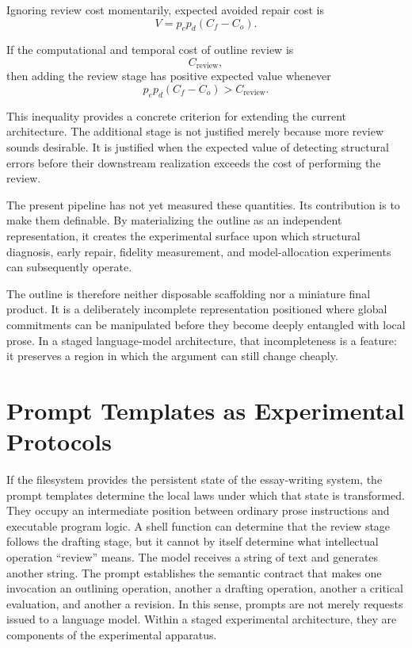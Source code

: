 \documentclass[11pt]{article}
\begin{document}
Ignoring review cost momentarily, expected avoided repair cost is
\[
    V
    =
    p_e p_d(C_f-C_o).
\]

If the computational and temporal cost of outline review is
\[
    C_{\mathrm{review}},
\]
then adding the review stage has positive expected value whenever
\[
    p_e p_d(C_f-C_o)
    >
    C_{\mathrm{review}}.
\]

This inequality provides a concrete criterion for extending the current architecture. The additional stage is not justified merely because more review sounds desirable. It is justified when the expected value of detecting structural errors before their downstream realization exceeds the cost of performing the review.

The present pipeline has not yet measured these quantities. Its contribution is to make them definable. By materializing the outline as an independent representation, it creates the experimental surface upon which structural diagnosis, early repair, fidelity measurement, and model-allocation experiments can subsequently operate.

The outline is therefore neither disposable scaffolding nor a miniature final product. It is a deliberately incomplete representation positioned where global commitments can be manipulated before they become deeply entangled with local prose. In a staged language-model architecture, that incompleteness is a feature: it preserves a region in which the argument can still change cheaply.

\section{Prompt Templates as Experimental Protocols}

If the filesystem provides the persistent state of the essay-writing system, the prompt templates determine the local laws under which that state is transformed. They occupy an intermediate position between ordinary prose instructions and executable program logic. A shell function can determine that the review stage follows the drafting stage, but it cannot by itself determine what intellectual operation ``review'' means. The model receives a string of text and generates another string. The prompt establishes the semantic contract that makes one invocation an outlining operation, another a drafting operation, another a critical evaluation, and another a revision. In this sense, prompts are not merely requests issued to a language model. Within a staged experimental architecture, they are components of the experimental apparatus.
\end{document}

